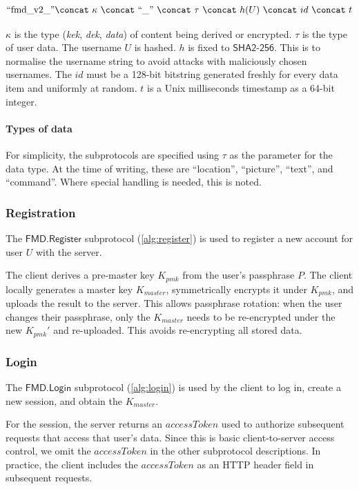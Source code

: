 \documentclass[11pt,a4paper]{article}
\newcommand{\FMDRegister}{\mathsf{FMD.Register}}
\newcommand{\FMDLogin}{\mathsf{FMD.Login}}
\newcommand{\SHATwoFiveSix}{\mathsf{SHA2\text{-}256}}
\begin{document}
$$ \text{``fmd\_v2\_''} \concat\ \kappa\ \concat\ \text{``\_''}\ \concat\ \tau\ \concat\ h(U)\ \concat\ id\ \concat\ t $$

$\kappa$ is the type (\emph{kek}, \emph{dek}, \emph{data}) of content being derived or encrypted.
$\tau$ is the type of user data.
The username $U$ is hashed. $h$ is fixed to $\SHATwoFiveSix$.
This is to normalise the username string to avoid attacks with maliciously chosen usernames.
The $id$ must be a 128-bit bitstring generated freshly for every data item and uniformly at random.
$t$ is a Unix milliseconds timestamp as a 64-bit integer.

\paragraph{Types of data}
For simplicity, the subprotocols are specified using $\tau$ as the parameter for the data type.
At the time of writing, these are ``location'', ``picture'', ``text'', and ``command''.
Where special handling is needed, this is noted.


\subsubsection{Registration}

The $\FMDRegister$ subprotocol (\autoref{alg:register}) is used to register a new account for user $U$ with the server.

The client derives a pre-master key $K_{pmk}$ from the user's passphrase $P$.
The client locally generates a master key $K_{master}$, symmetrically encrypts it under $K_{pmk}$,
and uploads the result to the server.
This allows passphrase rotation: when the user changes their passphrase,
only the $K_{master}$ needs to be re-encrypted under the new $K_{pmk}'$ and re-uploaded.
This avoids re-encrypting all stored data.


\subsubsection{Login}

The $\FMDLogin$ subprotocol (\autoref{alg:login}) is used by the client to log in, create a new session,
and obtain the $K_{master}$.

For the session, the server returns an $accessToken$ used to authorize subsequent requests
that access that user's data.
Since this is basic client-to-server access control,
we omit the $accessToken$ in the other subprotocol descriptions.
In practice, the client includes the $accessToken$ as an HTTP header field in subsequent requests.
\end{document}
